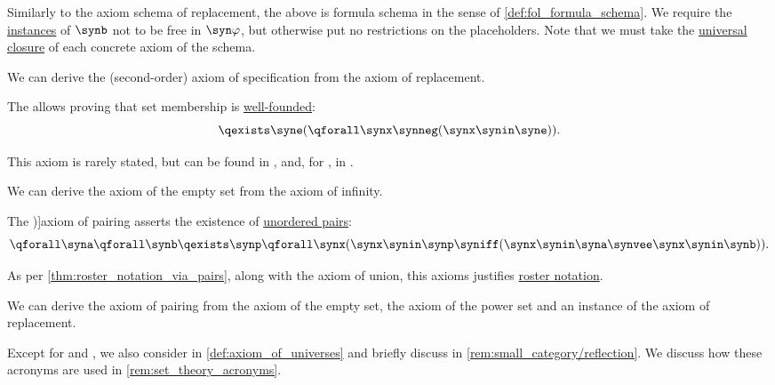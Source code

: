 \begin{definition}
\begin{thmenum}[resume=def:zfc]
    Similarly to the axiom schema of replacement, the above is formula schema in the sense of \cref{def:fol_formula_schema}. We require the \hyperref[con:schemas_and_instances]{instances} of \( \synb \) not to be free in \( \syn\varphi \), but otherwise put no restrictions on the placeholders. Note that we must take the \hyperref[def:fol_quantifier_closure]{universal closure} of each concrete axiom of the schema.

    We can derive the (second-order) axiom of specification from the axiom of replacement.

     The  allows proving that set membership is \hyperref[def:well_founded_relation]{well-founded}:
    \begin{equation}\label{eq:def:zfc/empty_set}
      \qexists \syne (\qforall \synx \synneg (\synx \synin \syne)).
    \end{equation}

    This axiom is rarely stated, but can be found in
    \cite[180]{Герасимов2014Вычислимость},
    \cite[159]{КолмогоровДрагалин2006ЛогикаДополнительныеГлавы}
    and, for \hyperref[rem:set_theory_acronyms/nbg]{}, in
    \cite[xix]{Mendelson2015Logic}.

    We can derive the axiom of the empty set from the axiom of infinity.

     The \term[ru=аксиома пары, en=axiom of pairing (\cite[190]{Kleene2002Logic})]{axiom of pairing} asserts the existence of \hyperref[def:unordered_pair]{unordered pairs}:
    \begin{equation}\label{eq:def:zfc/pairing}
      \qforall \syna \qforall \synb \qexists \synp \qforall \synx (\synx \synin \synp \syniff (\synx \synin \syna \synvee \synx \synin \synb)).
    \end{equation}

    As per \cref{thm:roster_notation_via_pairs}, along with the axiom of union, this axioms justifies \hyperref[def:set_theory_definition/roster]{roster notation}.

    We can derive the axiom of pairing from the axiom of the empty set, the axiom of the power set and an instance of the axiom of replacement.
  \end{thmenum}
\end{definition}
\begin{comments}
  \item Except for  and , we also consider  in \cref{def:axiom_of_universes} and briefly discuss  in \cref{rem:small_category/reflection}. We discuss how these acronyms are used in \cref{rem:set_theory_acronyms}.
\end{comments}
